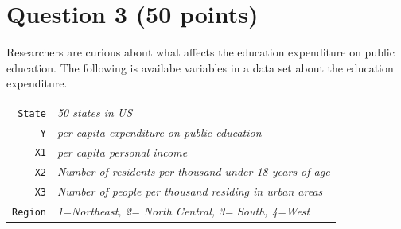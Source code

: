 \documentclass[12pt,letterpaper]{article}
\begin{document}
\vspace{1cm}
	\section*{Question 3 (50 points)}

\vspace{.5cm}
  
\vspace{.5cm}
\noindent Researchers are curious about what affects the education expenditure on public education. The following is availabe variables in a data set about the education expenditure. \\
\vspace{.5cm}




\begin{tabular}{r|l}
	\texttt{State} &\emph{50 states in US} \\
	\texttt{Y} & \emph{per capita expenditure on public education}\\
	\texttt{X1} &\emph{per capita personal income} \\
	\texttt{X2} &  \emph{Number of residents per thousand under 18 years of age}\\
	\texttt{X3} &  \emph{Number of people per thousand residing in urban areas} \\
	\texttt{Region} &  \emph{1=Northeast, 2= North Central, 3= South, 4=West} \\

\end{tabular}
\end{document}
